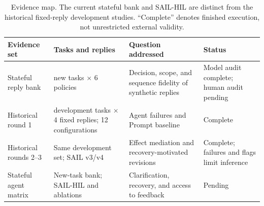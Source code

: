 \begin{table}[t]
\centering\normalsize
\caption{Evidence map. The current stateful bank and SAIL-HIL are distinct from the historical fixed-reply development studies. ``Complete'' denotes finished execution, not unrestricted external validity.}
\label{tab:studymap}
\begin{tabularx}{\linewidth}{@{}>{\raggedright\arraybackslash}p{.19\linewidth}>{\raggedright\arraybackslash}p{.25\linewidth}>{\raggedright\arraybackslash}X>{\raggedright\arraybackslash}p{.18\linewidth}@{}}
\toprule
\textbf{Evidence set} & \textbf{Tasks and replies} & \textbf{Question addressed} & \textbf{Status} \\
\midrule
Stateful reply bank
& 20 new tasks $\times$ 6 policies
& Decision, scope, and sequence fidelity of synthetic replies
& Model audit complete; human audit pending \\
\midrule
Historical round 1
& 20 development tasks $\times$ 4 fixed replies; 12 configurations
& Agent failures and Prompt baseline
& Complete \\
\midrule
Historical rounds 2--3
& Same development set; SAIL v3/v4
& Effect mediation and recovery-motivated revisions
& Complete; failures and flags limit inference \\
\midrule
Stateful agent matrix
& New-task bank; SAIL-HIL and ablations
& Clarification, recovery, and access to feedback
& Pending \\
\bottomrule
\end{tabularx}
\end{table}
